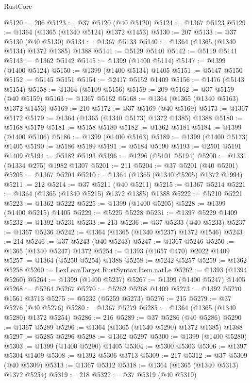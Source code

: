 \begin{lexlean}{RustCore}
\begin{coremodule}
@5120 := 206
@5123 := @37 @5120 (@40 @5120)
@5124 := @1367 @5123
@5129 := @1364 (@1365 (@1340 @5124) @1372 @1453)
@5130 := 207
@5133 := @37 @5130 (@40 @5130)
@5134 := @1367 @5133
@5140 := @1364 (@1365 (@1340 @5134) @1372 @1385) @1388
@5141 := @5129 @5140
@5142 := @5119 @5141
@5143 := @1362 @5142
@5145 := @1399 (@1400 @5114)
@5147 := @1399 (@1400 @5124)
@5150 := @1399 (@1400 @5134) @1405
@5151 := @5147 @5150
@5152 := @5145 @5151
@5154 := @2417 @5152 @1409
@5156 := @1476 (@5143 @5154)
@5158 := @1364 (@5109 @5156)
@5159 := 209
@5162 := @37 @5159 (@40 @5159)
@5163 := @1367 @5162
@5168 := @1364 (@1365 (@1340 @5163) @1372 @1453)
@5169 := 210
@5172 := @37 @5169 (@40 @5169)
@5173 := @1367 @5172
@5179 := @1364 (@1365 (@1340 @5173) @1372 @1385) @1388
@5180 := @5168 @5179
@5181 := @5158 @5180
@5182 := @1362 @5181
@5184 := @1399 (@1400 @5106)
@5186 := @1399 (@1400 @5163)
@5189 := @1399 (@1400 @5173) @1405
@5190 := @5186 @5189
@5191 := @5184 @5190
@5193 := @2501 @5191 @1409
@5194 := @5182 @5193
@5196 := @1296 (@5101 @5194)
@5200 := @1331 (@1334 @275) @1982 @1307
@5201 := 211
@5204 := @37 @5201 (@40 @5201)
@5205 := @1367 @5204
@5210 := @1364 (@1365 (@1340 @5205) @1372 @1994)
@5211 := 212
@5214 := @37 @5211 (@40 @5211)
@5215 := @1367 @5214
@5221 := @1364 (@1365 (@1340 @5215) @1372 @1385) @1388
@5222 := @5210 @5221
@5223 := @1362 @5222
@5225 := @1399 (@1400 @5205)
@5228 := @1399 (@1400 @5215) @1405
@5229 := @5225 @5228
@5231 := @1397 @5229 @1409
@5232 := @1392 @5231
@5233 := 213
@5236 := @37 @5233 (@40 @5233)
@5237 := @1367 @5236
@5242 := @1364 (@1365 (@1340 @5237) @1372 @1546)
@5243 := 214
@5246 := @37 @5243 (@40 @5243)
@5247 := @1367 @5246
@5250 := @1365 (@1340 @5247) @1372
@5254 := @1393 (@1657 @470) @2022 @1409
@5257 := @1364 (@5250 @5254) @1388
@5258 := @5242 @5257
@5259 := @1362 @5258
@5260 := LexLeanTarget.RustSyntax.Item.natLe
@5262 := @1393 (@1394 @5260)
@5264 := @1399 (@1400 @5237)
@5267 := @1399 (@1400 @5247) @1405
@5268 := @5264 @5267
@5270 := @5262 @5268 @1409
@5273 := @1392 @5270 @1561 @3713
@5275 := @5232 (@5259 @5273)
@5276 := 215
@5279 := @37 @5276 (@40 @5276)
@5280 := @1367 @5279
@5285 := @1364 (@1365 (@1340 @5280) @1372 @5254)
@5286 := 216
@5289 := @37 @5286 (@40 @5286)
@5290 := @1367 @5289
@5296 := @1364 (@1365 (@1340 @5290) @1372 @1385) @1388
@5297 := @5285 @5296
@5298 := @1362 @5297
@5300 := @1399 (@1400 @5280)
@5303 := @1399 (@1400 @5290) @1405
@5304 := @5300 @5303
@5306 := @1397 @5304 @1409
@5308 := @1392 @5306 @3713
@5309 := 217
@5312 := @37 @5309 (@40 @5309)
@5313 := @1367 @5312
@5318 := @1364 (@1365 (@1340 @5313) @1372 @5254)
@5319 := 218
@5322 := @37 @5319 (@40 @5319)

\end{coremodule}
\end{lexlean}
